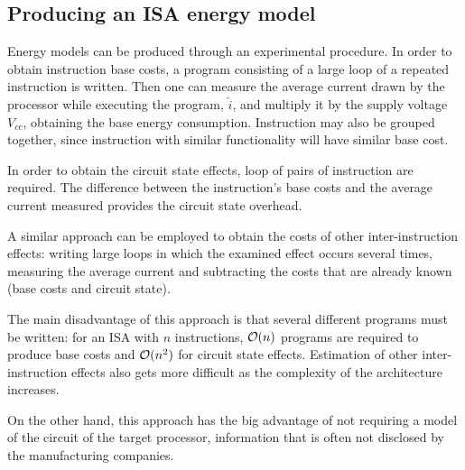\subsection{Producing an ISA energy model}
Energy models can be produced through an experimental procedure. \newline
In order to obtain instruction base costs, a program consisting of a large loop of a repeated instruction is written. Then one can measure the average current drawn by the processor while executing the program, $\hat{i}$, and multiply it by the supply voltage $V_{cc}$, obtaining the base energy consumption. \newline
Instruction may also be grouped together, since instruction with similar functionality will have similar base cost.\par 
In order to obtain the circuit state effects, loop of pairs of instruction are required. The difference between the instruction's base costs and the average current measured provides the circuit state overhead. \par 
A similar approach can be employed to obtain the costs of other inter-instruction effects: writing large loops in which the examined effect occurs several times, measuring the average current and subtracting the costs that are already known (base costs and circuit state). \par 
The main disadvantage of this approach is that several different programs must be written: for an ISA with $n$ instructions, $\mathcal{O}(n)$ programs are required to produce base costs and $\mathcal{O}(n^{2})$ for circuit state effects. \newline
Estimation of other inter-instruction effects also gets more difficult as the complexity of the architecture increases. \par
On the other hand, this approach has the big advantage of not requiring a model of the circuit of the target processor, information that is often not disclosed by the manufacturing companies.

